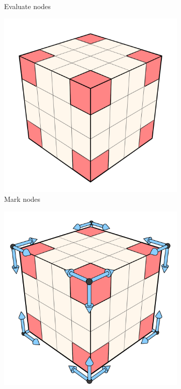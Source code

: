 \begin{figure}[t]
\begin{subfigure}[b]{.3\linewidth}
    \caption{\footnotesize Evaluate nodes}%
    \label{fig:hs-p1d}%
  \end{subfigure}
  \begin{subfigure}[b]{.3\linewidth}
    \includegraphics[width=\textwidth]{./img/raw/hs-slt-algorithm/hs-slt-algorithm-5.png}%
    \caption{\footnotesize Mark nodes}%
    \label{fig:hs-p1e}%
  \end{subfigure}
  \begin{subfigure}[b]{.3\linewidth}
    \includegraphics[width=\textwidth]{./img/raw/hs-slt-algorithm/hs-slt-algorithm-6.png}%

\end{subfigure}
\end{figure}
